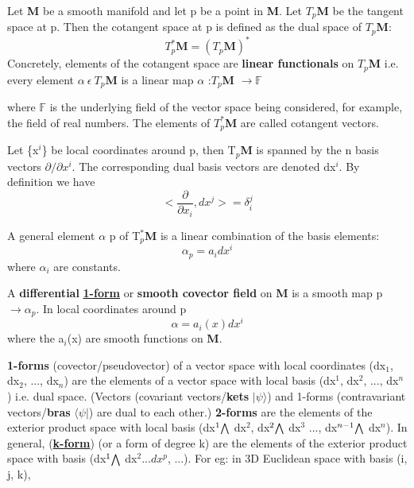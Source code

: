 Let  \textbf{M} be a smooth manifold and let  p be a point in \textbf{M}. 
Let  $T_{p}$\textbf{M} be the tangent space at p. 
Then the cotangent space at p is defined as the dual space of $T_{p}$\textbf{M}:
\begin{equation}
    T_{p}^{*}\textbf{M} = (T_{p}\textbf{M})^{*}
\end{equation}
Concretely, elements of the cotangent space are \textbf{linear functionals} on 
$T_{p}$\textbf{M} i.e. every element $\alpha \: \epsilon \: T_p$\textbf{M} is a linear map
$\alpha$ :$T_{p}$\textbf{M} $\rightarrow \mathbb{F}$

where $\mathbb{F}$ is the underlying field of the vector space being considered, for example, the field of real numbers. 
The elements of $T_{p}^{*}$\textbf{M} are called cotangent vectors.

Let \{x$^i$\} be local coordinates  around p, then T$_p$\textbf{M} is spanned by the n basis vectors $\partial/\partial x^i$. The
corresponding dual basis vectors are denoted dx$^i$. By definition we have
\begin{equation}
    \Bigg< \frac{\partial}{\partial x_i}, dx^j\Bigg> = \delta_i^j
\end{equation}

A general element $\alpha$ p of T$_p^*$\textbf{M} is a linear combination of
the basis elements:
\begin{equation}
    \alpha_p = a_i dx^i
\end{equation}
where $\alpha_i$ are constants.

A \textbf{differential} \href{https://mathworld.wolfram.com/One-Form.html}{\textbf{1-form}} or \textbf{smooth covector field}
on \textbf{M} is a smooth map p$\rightarrow \alpha_p$. In local coordinates around p 
\begin{equation}
    \alpha = a_i(x)dx^i
\end{equation}
where the a$_i$(x) are smooth functions on \textbf{M}.

\textbf{1-forms} (covector/pseudovector) of a vector space with local coordinates (dx$_1$, dx$_2$, ..., dx$_n$)
are the elements of a vector space with local basis (dx$^1$, dx$^2$, ..., dx$^n$) i.e. dual space.
(Vectors (covariant vectors/\textbf{kets} $|\psi \rangle$) and 1-forms (contravariant vectors/\textbf{bras} $\langle \psi |$) are dual to each other.)
\textbf{2-forms} are the elements of the exterior product space with local basis (dx$^1 \exterior$ dx$^2$, dx$^2 \exterior$ dx$^3$ ..., dx$^{n-1} \exterior$ dx$^n$).
In general, (\href{https://www.physicsforums.com/threads/what-is-2-form.762846/#:~:text=The%201%2Dforms%20(or%20covectors,the%20bases%20may%20be%20omitted.}{\textbf{k-form}})
(or a form of degree k) are the elements of the exterior product space with basis (dx$^1 \exterior$ dx$^2 ... dx^p$, ...). For eg:
in 3D Euclidean space with basis (i, j, k), 

